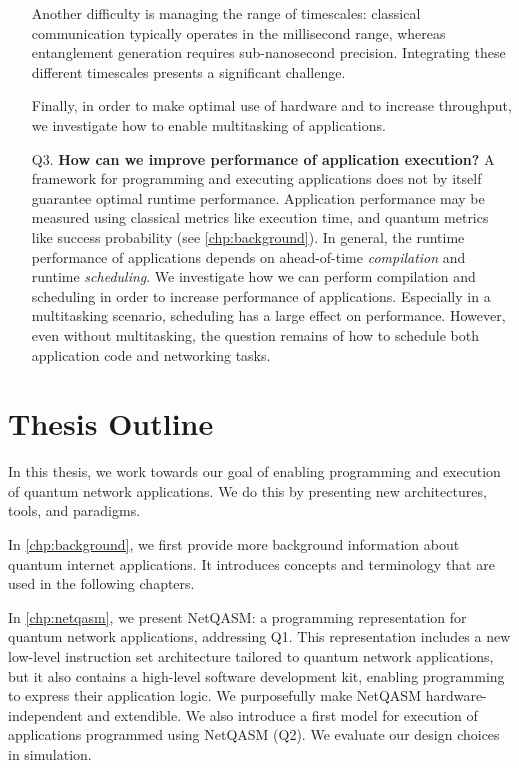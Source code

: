 \begin{itemize}
    Another difficulty is managing the range of timescales: classical communication typically operates in the millisecond range, whereas entanglement generation requires sub-nanosecond precision.
    Integrating these different timescales presents a significant challenge.

    Finally, in order to make optimal use of hardware and to increase throughput, we investigate how to enable multitasking of applications.

  \item[Q3.] \textbf{How can we improve performance of application execution?}
    A framework for programming and executing applications does not by itself guarantee optimal runtime performance.
    Application performance may be measured using classical metrics like execution time, and quantum metrics like success probability (see \cref{chp:background}).
    In general, the runtime performance of applications depends on ahead-of-time \emph{compilation} and runtime \emph{scheduling}.
    We investigate how we can perform compilation and scheduling in order to increase performance of applications.
    Especially in a multitasking scenario, scheduling has a large effect on performance.
    However, even without multitasking, the question remains of how to schedule both application code and networking tasks.

\end{itemize}


\section{Thesis Outline}
In this thesis, we work towards our goal of enabling programming and execution of quantum network applications.
We do this by presenting new architectures, tools, and paradigms.

In \cref{chp:background}, we first provide more background information about quantum internet applications.
It introduces concepts and terminology that are used in the following chapters.

In \cref{chp:netqasm}, we present NetQASM: a programming representation for quantum network applications, addressing Q1.
This representation includes a new low-level instruction set architecture tailored to quantum network applications,
but it also contains a high-level software development kit, enabling programming to express their application logic.
We purposefully make NetQASM hardware-independent and extendible.
We also introduce a first model for execution of applications programmed using NetQASM (Q2).
We evaluate our design choices in simulation.

